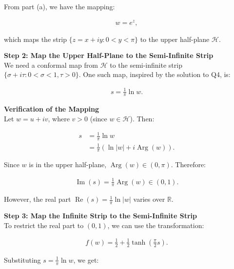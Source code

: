 \begin{example}
    From part (a), we have the mapping:

    \begin{align*}
        w = e^{z},
    \end{align*}

    which maps the strip $\{ z = x + iy : 0 < y < \pi \}$ to the upper half-plane $\mathcal{H}$.

    \textbf{Step 2: Map the Upper Half-Plane to the Semi-Infinite Strip} \\

    We need a conformal map from $\mathcal{H}$ to the semi-infinite strip $\{ \sigma + i\tau : 0 < \sigma < 1, \tau > 0 \}$. One such map, inspired by the solution to Q4, is:

    \begin{align*}
        s = \frac{1}{\pi} \ln w.
    \end{align*}

    \textbf{Verification of the Mapping} \\

    Let $w = u + i v$, where $v > 0$ (since $w \in \mathcal{H}$). Then:

    \begin{align*}
        s & = \frac{1}{\pi} \ln w                                \\
          & = \frac{1}{\pi} (\ln |w| + i \operatorname{Arg}(w)).
    \end{align*}

    Since $w$ is in the upper half-plane, $\operatorname{Arg}(w) \in (0, \pi)$. Therefore:

    \begin{align*}
        \operatorname{Im}(s) = \frac{1}{\pi} \operatorname{Arg}(w) \in \left( 0, 1 \right).
    \end{align*}

    However, the real part $\operatorname{Re}(s) = \frac{1}{\pi} \ln |w|$ varies over $\mathbb{R}$.

    \textbf{Step 3: Map the Infinite Strip to the Semi-Infinite Strip} \\

    To restrict the real part to $(0,1)$, we can use the transformation:

    \begin{align*}
        f(w) = \frac{1}{2} + \frac{1}{2} \tanh\left( \frac{\pi}{2} s \right).
    \end{align*}

    Substituting $s = \frac{1}{\pi} \ln w$, we get:


\end{example}
